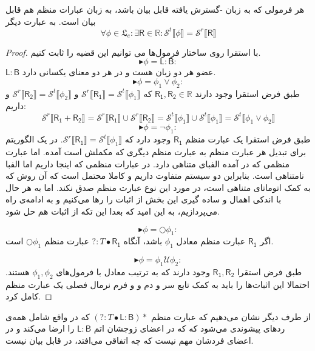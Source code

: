 \begin{thm}
	هر فرمولی که به زبان -گسترش یافته قابل بیان باشد، به زبان عبارات منظم هم قابل بیان است. به عبارت دیگر 
	$$\forall \phi \in \mathfrak{L}_e: \exists \mathsf{R} \in \mathbb{R} : \mathcal{S}^t \llbracket \phi \rrbracket = \mathcal{S}^r \llbracket \mathsf{R} \rrbracket$$
\end{thm}
\begin{proof}
	با استقرا روی ساختار فرمول‌ها می توانیم این قضیه را ثابت کنیم.
	$$\blacktriangleright\phi=\mathsf{L:B}:$$
	$\mathsf{L:B}$ عضو هر دو زبان هست و در هر دو معنای یکسانی دارد.
	$$\blacktriangleright\phi= \phi_1 \lor \phi_2:$$
	طبق فرض استقرا وجود دارند 
	$\mathsf{R_1,R_2} \in \mathbb{R}$
	که
	$\mathcal{S}^r \llbracket \mathsf{R_1} \rrbracket = \mathcal{S}^t \llbracket \phi_1 \rrbracket$ 
	و
	$\mathcal{S}^r \llbracket \mathsf{R_2} \rrbracket = \mathcal{S}^t \llbracket \phi_2 \rrbracket$
	و داریم:
	$$\mathcal{S}^r \llbracket \mathsf{ R_1 + R_2} \rrbracket =  \mathcal{S}^r \llbracket \mathsf{R_1} \rrbracket \cup \mathcal{S}^r \llbracket \mathsf{R_2} \rrbracket = \mathcal{S}^t \llbracket \phi_1 \rrbracket \cup \mathcal{S}^t \llbracket \phi_1 \rrbracket = \mathcal{S}^t \llbracket \phi_1 \lor \phi_2 \rrbracket$$
	$$\blacktriangleright\phi= \neg \phi_1:$$
	طبق فرض استقرا یک عبارت منظم $\mathsf{R_1}$ وجود دارد که 
	$\mathcal{S}^r \llbracket \mathsf{R_1} \rrbracket = \mathcal{S}^t \llbracket \phi_1 \rrbracket $.
	در \cite{sipser13} یک الگوریتم برای تبدیل هر عبارت منظم به عبارت منظم دیگری که مکملش است آمده. اما عبارت منظمی که در \cite{sipser13} آمده الفبای متناهی دارد. در عبارات منظمی که اینجا داریم اما الفبا نامتناهی است. بنابراین دو سیستم متفاوت داریم و کاملا محتمل است که آن روش که به کمک اتوماتای متناهی است، در مورد این نوع عبارت منظم صدق نکند. اما به هر حال با اندکی اهمال و ساده گیری این بخش از اثبات را رها می‌کنیم و به ادامه‌ی راه می‌پردازیم، به این امید که بعدا این تکه از اثبات هم حل شود.
	
	$$\blacktriangleright\phi= \bigcirc \phi_1:$$
	اگر $\mathsf{R_1}$ عبارت منظم معادل $\phi_1$ باشد، آنگاه 
	$?: \mathit{T} \bullet \mathsf{R_1}$
	عبارت منظم $\bigcirc \phi_1$ است.
	
	$$\blacktriangleright\phi= \phi_1 \mathcal{U} \phi_2:$$
	طبق فرض استقرا $\mathsf{R_1,R_2}$ وجود دارند که به ترتیب معادل با فرمول‌های $\phi_1,\phi_2$ هستند. احتمالا این اثبات‌ها را باید به کمک تابع سر و دم و و فرم نرمال فصلی یک عبارت منظم کامل کرد.
	
	
\end{proof}


از طرف دیگر نشان می‌دهیم که عبارت منظم 
$\mathsf{ (?:\mathit{T} \bullet L:B)*}$
که در واقع شامل همه‌ی رد‌های پیشوندی می‌شود که که در اعضای زوجشان اتم $\mathsf{L:B}$ را ارضا می‌کند و در اعضای فردشان مهم نیست که چه اتفاقی می‌افتد، در  قابل بیان نیست.

